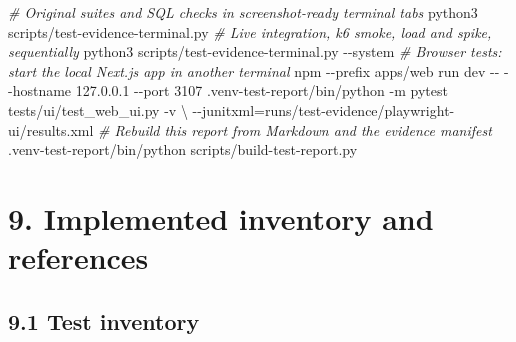 \documentclass[
  11pt,
]{article}
\newenvironment{Shaded}{}{}
\newcommand{\AttributeTok}[1]{\textcolor[rgb]{0.49,0.56,0.16}{#1}}
\newcommand{\CommentTok}[1]{\textcolor[rgb]{0.38,0.63,0.69}{\textit{#1}}}
\newcommand{\DataTypeTok}[1]{\textcolor[rgb]{0.56,0.13,0.00}{#1}}
\newcommand{\ExtensionTok}[1]{#1}
\newcommand{\NormalTok}[1]{#1}
\newcommand{\OperatorTok}[1]{\textcolor[rgb]{0.40,0.40,0.40}{#1}}
\begin{document}
\begin{Shaded}
\begin{Highlighting}[]
\CommentTok{\# Original suites and SQL checks in screenshot{-}ready terminal tabs}
\ExtensionTok{python3}\NormalTok{ scripts/test{-}evidence{-}terminal.py}
\CommentTok{\# Live integration, k6 smoke, load and spike, sequentially}
\ExtensionTok{python3}\NormalTok{ scripts/test{-}evidence{-}terminal.py }\AttributeTok{{-}{-}system}
\CommentTok{\# Browser tests: start the local Next.js app in another terminal}
\ExtensionTok{npm} \AttributeTok{{-}{-}prefix}\NormalTok{ apps/web run dev }\AttributeTok{{-}{-}} \AttributeTok{{-}{-}hostname}\NormalTok{ 127.0.0.1 }\AttributeTok{{-}{-}port}\NormalTok{ 3107}
\ExtensionTok{.venv{-}test{-}report/bin/python} \AttributeTok{{-}m}\NormalTok{ pytest tests/ui/test\_web\_ui.py }\AttributeTok{{-}v} \DataTypeTok{\textbackslash{}}
  \AttributeTok{{-}{-}junitxml}\OperatorTok{=}\NormalTok{runs/test{-}evidence/playwright{-}ui/results.xml}
\CommentTok{\# Rebuild this report from Markdown and the evidence manifest}
\ExtensionTok{.venv{-}test{-}report/bin/python}\NormalTok{ scripts/build{-}test{-}report.py}
\end{Highlighting}
\end{Shaded}

\section{9. Implemented inventory and
references}\label{implemented-inventory-and-references}

\subsection{9.1 Test inventory}\label{test-inventory}
\end{document}
